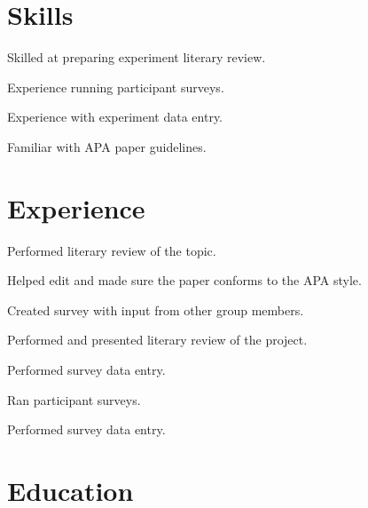 \documentclass{resume}
\begin{document}
\author{Alexander Ratnikov}
\maketitle

\section{Skills}

\begin{compactitem}
  \item Skilled at preparing experiment literary review.
  \item Experience running participant surveys.
  \item Experience with experiment data entry.
  \item Familiar with APA paper guidelines.
\end{compactitem}

\section{Experience}

\begin{compactitem}
  \item Performed literary review of the topic.
  \item Helped edit and made sure the paper conforms to the APA style.
\end{compactitem}

\begin{compactitem}
  \item Created survey with input from other group members.
  \item Performed and presented literary review of the project.
  \item Performed survey data entry.
\end{compactitem}

\begin{compactitem}
  \item Ran participant surveys.
  \item Performed survey data entry.
\end{compactitem}

\section{Education}
\end{document}
